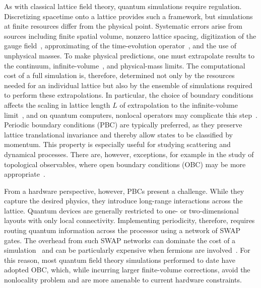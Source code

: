 \documentclass[twocolumn,superscriptaddress,showpacs,nofootinbib,notitlepage,preprintnumbers,secnumarabic,amssymb, floatfix, nobibnotes, aps, prd]{revtex4-2}
\begin{document}
As with classical lattice field theory, quantum simulations require regulation.
Discretizing spacetime onto a lattice provides such a framework, but simulations at finite resources differ from the physical point. 
Systematic errors arise from sources including finite spatial volume, nonzero lattice spacing, digitization of the gauge field~\cite{Ciavarella:2025tdl}, approximating of the time-evolution operator~\cite{Kane:2025ybw}, and the use of unphysical masses. 
To make physical predictions, one must extrapolate results to the continuum, infinite-volume~\cite{Burbano:2025pef}, and physical-mass limits. 
The computational cost of a full simulation is, therefore, determined not only by the resources needed for an individual lattice but also by the ensemble of simulations required to perform these extrapolations.
In particular, the choice of boundary conditions affects the scaling in lattice length $L$ of extrapolation to the infinite-volume limit~\cite{Briceno:2020rar}, and on quantum computers, nonlocal operators may complicate this step~\cite{Briceno:2018lfj}.
Periodic boundary conditions (PBC) are typically preferred, as they preserve lattice translational invariance and thereby allow states to be classified by momentum. 
This property is especially useful for studying scattering and dynamical processes. 
There are, however, exceptions, for example in the study of topological observables, where open boundary conditions (OBC) may be more appropriate~\cite{Luscher:2011kk}.

From a hardware perspective, however, PBCs present a challenge. 
While they capture the desired physics, they introduce long-range interactions across the lattice. 
Quantum devices are generally restricted to one- or two-dimensional layouts with only local connectivity. 
Implementing periodicity, therefore, requires routing quantum information across the processor using a network of SWAP gates. 
The overhead from such SWAP networks can dominate the cost of a simulation~\cite{brierley2016efficientimplementationquantumcircuits,Zhu:2025upm,Parella-Dilme:2025yan} and can be particularly expensive when fermions are involved~\cite{PhysRevLett.120.110501}. 
For this reason, most quantum field theory simulations performed to date have adopted OBC, which, while incurring larger finite-volume corrections, avoid the nonlocality problem and are more amenable to current hardware constraints.
\end{document}
